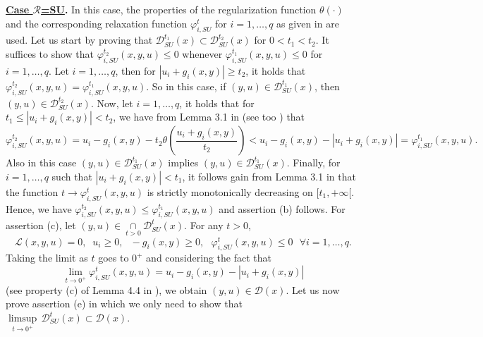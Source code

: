  \medskip
\noindent\textbf{\underline{Case $\mathcal{R}$=SU}.} In this case, the properties of the regularization function $\theta(\cdot)$ and the corresponding relaxation function $\varphi_{i,SU}^{t}$ for $i=1, \ldots, q$ as given in \cite{SU} %
are used.  Let us start by proving that $\mathcal{D}_{SU}^{t_{1}}(x)\subset\mathcal{D}_{SU}^{t_{2}}(x)$ for
		$0<t_{1}<t_{2}$. It suffices to show that 
$\varphi_{i,SU}^{t_2}(x,y,u)\leq0 $ whenever $\varphi_{i,SU}^{t_1}(x,y,u)\leq0 $  for $i=1,\ldots,q$. Let $i=1,\ldots,q$, then for  $\left\vert
u_{i}+g_{i}(x,y)\right\vert \geq t_{2}$, it holds that
$\varphi_{i,SU}^{t_2}(x,y,u) = \varphi_{i,SU}^{t_1}(x,y,u).$ So in this case, if $(y,u)\in \mathcal{D}_{SU}^{t_{1}}(x)$, then $(y,u) \in \mathcal{D}_{SU}^{t_{2}}(x)$. Now, let $i=1,\ldots,q$, it holds that for  $ t_{1} \leq  \left\vert
u_{i}+g_{i}(x,y)\right\vert <t_{2}$, we have from Lemma 3.1 in \cite{SU}  (see too \cite[Lemma 4.4 (a)]{Hoheisel2010}) that
\[
\varphi_{i,SU}^{t_2}(x,y,u)= u_{i}-g_{i}(x,y)-t_{2}\theta\left(\dfrac{u_{i}+g_{i}(x,y)}{t_{2}}\right) <u_{i}-g_{i}(x,y)-\left\vert
u_{i}+g_{i}(x,y)\right\vert =\varphi_{i,SU}^{t_1}(x,y,u).
\]
Also in this case $(y,u)\in\mathcal{D}_{SU}^{t_{1}}(x)$  implies $(y,u) \in \mathcal{D}_{SU}^{t_{1}}(x)$. 
Finally, for $i=1, \ldots, q$ such that $\left\vert
 u_{i}+g_{i}(x,y)\right\vert <t_{1}$, it follows gain from Lemma 3.1 in \cite{SU} that the function $t\rightarrow\varphi_{i,SU}^{t}(x,y,u)$ is strictly
    monotonically decreasing on  $ [t_1,+\infty[$. Hence, we have $ \varphi_{i,SU}^{t_2}(x,y,u) \leq \varphi_{i,SU}^{t_1}(x,y,u)$ and assertion (b) follows. 
For assertion (c), let $(y,u) \in \underset{t>0}{\cap}\mathcal{D}_{SU}^{t}(x)$. For any $t>0$, 
\[
 \mathcal{L}(x,y,u)=0, \;\; u_{i}\geq0,\text{ \ }-g_{i}(x,y)\geq0,\text{ \ } 
\varphi_{i,SU}^{t}(x,y,u) \leq0\text{ \ } \forall i=1,\ldots,q.
\]
Taking the limit as $t$ goes to $0^+$ and considering the fact that 
\[
\underset{t\rightarrow0^+}{\lim}\varphi_{i,SU}^{t}(x,y,u)=u_{i}-g_{i}(x,y)-\left\vert u_{i}+g_{i}(x,y)\right\vert
\]
(see property (c) of Lemma 4.4 in \cite{Hoheisel2010}),  
we obtain
$(y,u) \in \mathcal{D}(x)$. Let us now prove assertion (e) in which we only need to show that $\underset{t\rightarrow0^+}{\limsup} \, \mathcal{D}_{SU}^{t}(x)\subset \mathcal{D}(x).$
